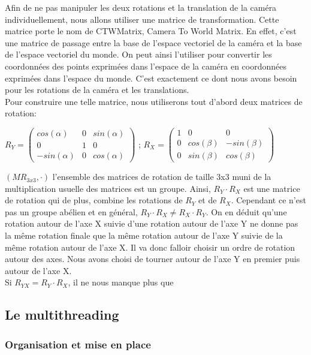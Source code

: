 \documentclass[11pt]{article}
\begin{document}
Afin de ne pas manipuler les deux rotations et la translation de la caméra individuellement, nous allons utiliser une matrice de transformation. Cette matrice porte le nom de CTWMatrix, Camera To World Matrix. En effet, c'est une matrice de passage entre la base de l'espace vectoriel de la caméra et la base de l'espace vectoriel du monde. On peut ainsi l'utiliser pour convertir les coordonnées des points exprimées dans l'espace de la caméra en coordonnées exprimées dans l'espace du monde. C'est exactement ce dont nous avons besoin pour les rotations de la caméra et les translations.\\
Pour construire une telle matrice, nous utiliserons tout d'abord deux matrices de rotation:
\begin{center}
	$R_Y =
	\begin{pmatrix}
		cos(\alpha) & 0 & sin(\alpha)\\
		0 & 1 & 0\\
		-sin(\alpha) & 0 & cos(\alpha)
	\end{pmatrix}
	$ ;
	$R_X = 
	\begin{pmatrix}
		1 & 0 & 0\\
		0 & cos(\beta) & -sin(\beta)\\
		0 & sin(\beta) & cos(\beta)
	\end{pmatrix}
	$
\end{center}

$(MR_{3x3}, \cdot)$ l'ensemble des matrices de rotation de taille 3x3 muni de la multiplication usuelle des matrices est un groupe. Ainsi, $R_Y\cdot R_X$ est une matrice de rotation qui de plus, combine les rotations de $R_Y$ et de $R_X$. Cependant ce n'est pas un groupe abélien et en général, $R_Y\cdot R_X \ne R_X\cdot R_Y$. On en déduit qu'une rotation autour de l'axe X suivie d'une rotation autour de l'axe Y ne donne pas la même rotation finale que la même rotation autour de l'axe Y suivie de la même rotation autour de l'axe X. Il va donc falloir choisir un ordre de rotation autour des axes. Nous avons choisi de tourner autour de l'axe Y en premier puis autour de l'axe X.\\
Si $R_{YX} = R_Y\cdot R_X$, il ne nous manque plus que 

\label{rotationsCamera}

\subsection{Le multithreading}
\subsubsection{Organisation et mise en place}
\end{document}
